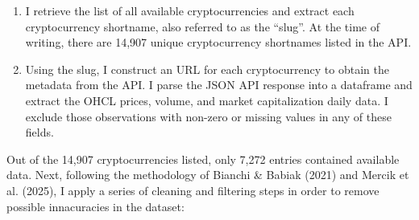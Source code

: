 \documentclass[
  11pt,
  a4paper,
  openany]{scrreprt}
\begin{document}
\begin{enumerate}
\def\labelenumi{\arabic{enumi}.}
\item
  I retrieve the list of all available cryptocurrencies and extract each
  cryptocurrency shortname, also referred to as the ``slug''. At the
  time of writing, there are 14,907 unique cryptocurrency shortnames
  listed in the API.
\item
  Using the slug, I construct an URL for each cryptocurrency to obtain
  the metadata from the API. I parse the JSON API response into a
  dataframe and extract the OHCL prices, volume, and market
  capitalization daily data. I exclude those observations with non-zero
  or missing values in any of these fields.
\end{enumerate}

Out of the 14,907 cryptocurrencies listed, only 7,272 entries contained
available data. Next, following the methodology of Bianchi \& Babiak
(2021) and Mercik et al. (2025), I apply a series of cleaning and
filtering steps in order to remove possible innacuracies in the dataset:
\end{document}
